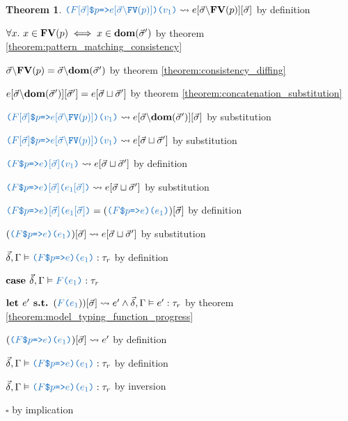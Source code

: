 \documentclass[acmsmall]{acmart}
\theoremstyle{definition}
\newtheorem{theorem}{Theorem}[section]
\begin{document}
\begin{theorem}
      \item \Z\Z $\obj{($F[\vec{\sigma}]$\$$p$=>$e[\vec{\sigma}\backslash\B{FV}(p)]$)($v_1$)} \rightsquigarrow e[\vec{\sigma}\backslash\B{FV}(p)][\vec{\sigma}]$ by definition 

      \item \Z\Z $\forall x .\ x \in \textbf{FV}(p) \iff x \in \textbf{dom}(\vec{\sigma}')$ 
      by theorem \ref{theorem:pattern_matching_consistency}
      \item \Z\Z $\vec{\sigma}\backslash\textbf{FV}(p) = \vec{\sigma}\backslash\textbf{dom}(\vec{\sigma}')$ 
      by theorem \ref{theorem:consistency_diffing}
      \item \Z\Z $e[\vec{\sigma}\backslash\textbf{dom}(\vec{\sigma}')][\vec{\sigma}'] = e[\vec{\sigma} \sqcup \vec{\sigma}']$ 
      by theorem \ref{theorem:concatenation_substitution}

      \item \Z\Z $\obj{($F[\vec{\sigma}]$\$$p$=>$e[\vec{\sigma}\backslash\B{FV}(p)]$)($v_1$)} \rightsquigarrow e[\vec{\sigma}\backslash\B{dom}(\vec{\sigma}')][\vec{\sigma}]$ 
        by substitution
      \item \Z\Z $\obj{($F[\vec{\sigma}]$\$$p$=>$e[\vec{\sigma}\backslash\B{FV}(p)]$)($v_1$)} \rightsquigarrow e[\vec{\sigma} \sqcup \vec{\sigma}']$ 
        by substitution 
      \item \Z\Z $\obj{($F$\$$p$=>$e$)$[\vec{\sigma}]$($v_1$)} \rightsquigarrow e[\vec{\sigma} \sqcup \vec{\sigma}']$ by definition 
      \item \Z\Z $\obj{($F$\$$p$=>$e$)$[\vec{\sigma}]$($e_1[\vec{\sigma}]$)} \rightsquigarrow e[\vec{\sigma} \sqcup \vec{\sigma}']$ by substitution  

      \item \Z\Z $\obj{($F$\$$p$=>$e$)$[\vec{\sigma}]$($e_1[\vec{\sigma}]$)} = (\obj{($F$\$$p$=>$e$)($e_1$)})[\vec{\sigma}]$ by definition  
      \item \Z\Z $(\obj{($F$\$$p$=>$e$)($e_1$)})[\vec{\sigma}] \rightsquigarrow e[\vec{\sigma} \sqcup \vec{\sigma}']$ by substitution  

      \item \Z\Z $\vec{\delta}, \Gamma \satisfies \obj{($F$\$$p$=>$e$)($e_1$)} \hastype \tau_r$ by definition

    \item \Z $\B{case } \vec{\delta}, \Gamma \satisfies \obj{$F$($e_1$)} \hastype \tau_r$ 
      \item \Z\Z $\B{let } e' \B{ s.t. } (\obj{$F$($e_1$}))[\vec{\sigma}] \rightsquigarrow e' \land \vec{\delta}, \Gamma \satisfies e' \hastype \tau_r$ by theorem \ref{theorem:model_typing_function_progress}
      \item \Z\Z $(\obj{($F$\$$p$=>$e$)($e_1$)})[\vec{\sigma}] \rightsquigarrow e'$ by definition 
      \item \Z\Z $\vec{\delta}, \Gamma \satisfies \obj{($F$\$$p$=>$e$)($e_1$)} \hastype \tau_r$ by definition
    \item \Z $\vec{\delta}, \Gamma \satisfies \obj{($F$\$$p$=>$e$)($e_1$)} \hastype \tau_r$ by inversion 
  \item $\square$ by implication
\end{theorem}
\end{document}
